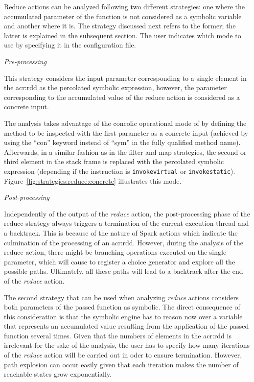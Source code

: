 Reduce actions can be analyzed following two different strategies: one where the accumulated parameter of the function is not considered as a symbolic variable and another where it is. The strategy discussed next refers to the former; the latter is explained in the subsequent section. The user indicates which mode to use by specifying it in the configuration file.

\textit{Pre-processing}

This strategy considers the input parameter corresponding to a single element in the \acrshort{acr:rdd} as the percolated symbolic expression, however, the parameter corresponding to the accumulated value of the reduce action is considered as a concrete input. 

The analysis takes advantage of the concolic operational mode of \spf{} by defining the method to be inspected with the first parameter as a concrete input (achieved by using the ``con'' keyword instead of ``sym'' in the fully qualified method name). Afterwards, in a similar fashion as in the filter and map strategies, the second or third element in the stack frame is replaced with the percolated symbolic expression (depending if the instruction is \texttt{invokevirtual} or \texttt{invokestatic}). Figure~\ref{fig:strategies:reduce:concrete} illustrates this mode.

\textit{Post-processing}

Independently of the output of the \textit{reduce} action, the post-processing phase of the reduce strategy always triggers a termination of the current execution thread and a backtrack. This is because of the nature of Spark actions which indicate the culmination of the processing of an \acrshort{acr:rdd}. However, during the analysis of the reduce action, there might be branching operations executed on the single parameter, which will cause \spf{} to register a choice generator and explore all the possible paths. Ultimately, all these paths will lead to a backtrack after the end of the \textit{reduce} action.


The second strategy that can be used when analyzing \textit{reduce} actions considers both parameters of the passed function as symbolic. The direct consequence of this consideration is that the symbolic engine has to reason now over a variable that represents an accumulated value resulting from the application of the passed function several times. Given that the numbers of elements in the \acrshort{acr:rdd} is irrelevant for the sake of the analysis, the user has to specify how many iterations of the \textit{reduce} action will be carried out in oder to ensure termination. However, path explosion can occur easily given that each iteration makes the number of reachable states grow exponentially.


